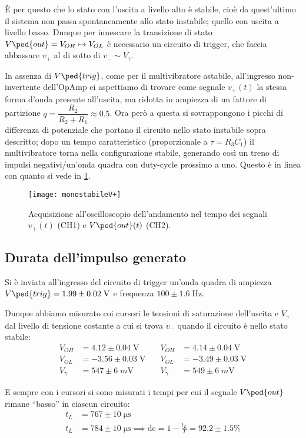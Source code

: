 \documentclass[10pt, a4paper, italian]{article}
\begin{document}
\`E per questo che lo stato con l'uscita a livello alto è stabile,
cioè da quest'ultimo il sistema non passa spontaneamente allo stato instabile;
quello con uscita a livello basso.
Dunque per innescare la transizione di stato
$V\ped{out} = V_{OH} \mapsto V_{OL}$ è necessario un circuito di trigger,
che faccia abbassare $v_+$ al di sotto di $v_- \sim V_\gamma$.

In assenza di $V\ped{trig}$, come per il multivibratore astabile, all'ingresso
non-invertente dell'OpAmp ci aspettiamo di trovare come segnale $v_+ (t)$ la
stessa forma d'onda presente all'uscita, ma ridotta in ampiezza di un fattore di partizione $q = \dfrac{R_2}{R_2 + R_1} \approx 0.5$.
Ora però a questa si sovrappongono i picchi di differenza di potenziale che
portano il circuito nello stato instabile sopra descritto; dopo un tempo
caratteristico (proporzionale a $\tau = R_3 C_1$) il multivibratore torna
nella configurazione stabile, generando così un treno di impulsi
negativi/un'onda quadra con duty-cycle prossimo a uno.
Questo è in linea con quanto si vede in \cref{fig: mstabilev+}.
\begin{figure}[htbp]
	\centering
	\texttt{[image: monostabileV+]}
	\caption{Acquisizione all'oscilloscopio dell'andamento nel tempo dei
	segnali $v_+ (t)$ (CH1) e $V\ped{out} (t)$ (CH2). \label{fig: mstabilev+}}
\end{figure}

\subsection{Durata dell'impulso generato}
Si è inviata all'ingresso del circuito di trigger un'onda quadra di ampiezza
$V\ped{trig} = 1.99 \pm 0.02 \; \si{\V}$ e frequenza $100 \pm 1.6 \; \si{\Hz}$.

Dunque abbiamo misurato coi cursori le tensioni di saturazione dell'uscita e 
$V_\gamma$ dal livello di tensione costante a cui si trova $v_-$ quando il
circuito è nello stato stabile:
\begin{align*}
V_{OH} &= 4.12 \pm 0.04 \; \si{\V} \quad &V_{OH} &= 4.14 \pm 0.04 \; \si{\V} \\
V_{OL} &= -3.56 \pm 0.03 \; \si{\V} \quad &V_{OL} &= -3.49 \pm 0.03 \; \si{\V} \\
V_{\gamma} &= 547 \pm 6 \; \si{m\V} \quad &V_{\gamma} &= 549 \pm 6 \; \si{m\V}
\end{align*}

E sempre con i cursori si sono misurati i tempi per cui il segnale $V\ped{out}$
rimane ``basso'' in ciascun circuito:
\begin{align*}
t_L &= 767 \pm 10 \;\si{\micro\s} \\
t_L &= 784 \pm 10 \;\si{\micro\s}
\implies \mathrm{dc} = 1 - \frac{t_L}{T} = 92.2 \pm 1.5 \% 
\end{align*}
\end{document}
